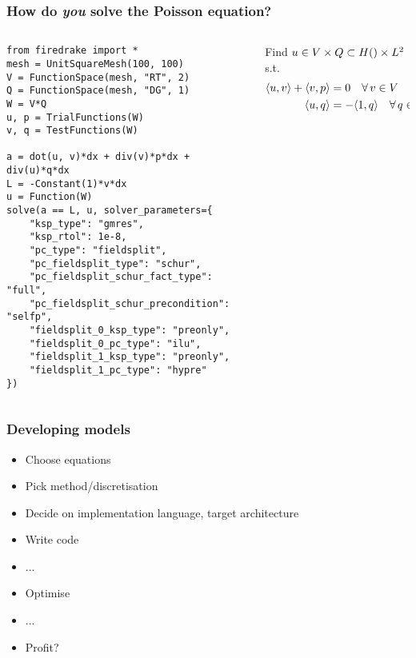 \documentclass[presentation]{beamer}
\let\div\relax
\DeclareMathOperator{\div}{div}
\newcommand{\inner}[2]{\ensuremath{\langle #1, #2 \rangle}}
\begin{document}
\begin{frame}[fragile]
  \frametitle{How do \emph{you} solve the Poisson equation?}
  \begin{columns}
    \begin{column}{0.65\textwidth}
\begin{verbatim}
from firedrake import *
mesh = UnitSquareMesh(100, 100)
V = FunctionSpace(mesh, "RT", 2)
Q = FunctionSpace(mesh, "DG", 1)
W = V*Q
u, p = TrialFunctions(W)
v, q = TestFunctions(W)

a = dot(u, v)*dx + div(v)*p*dx + div(u)*q*dx
L = -Constant(1)*v*dx
u = Function(W)
solve(a == L, u, solver_parameters={
    "ksp_type": "gmres", 
    "ksp_rtol": 1e-8,
    "pc_type": "fieldsplit",
    "pc_fieldsplit_type": "schur",
    "pc_fieldsplit_schur_fact_type": "full",
    "pc_fieldsplit_schur_precondition": "selfp",
    "fieldsplit_0_ksp_type": "preonly",
    "fieldsplit_0_pc_type": "ilu",
    "fieldsplit_1_ksp_type": "preonly",
    "fieldsplit_1_pc_type": "hypre"
})
\end{verbatim}
    \end{column}
    \hspace{-4em}
    \begin{column}{0.5\textwidth}
      Find $u\in V\times Q\subset H(\div)\times L^2$ s.t.
      \begin{align*}
        \inner{u}{v} + \inner{\div v}{p} &= 0 \quad\forall\, v \in V\\
        \inner{\div u}{q} &= -\inner{1}{q}\quad\forall\, q \in Q.
      \end{align*}
    \end{column}
  \end{columns}
\end{frame}


\begin{frame}
  \frametitle{Developing models}

  \begin{itemize}
  \item Choose equations
  \item Pick method/discretisation
  \item Decide on implementation language, target architecture
  \item Write code
  \item ...
  \item Optimise
  \item ...
  \item Profit?
  \end{itemize}
\end{frame}
\end{document}
